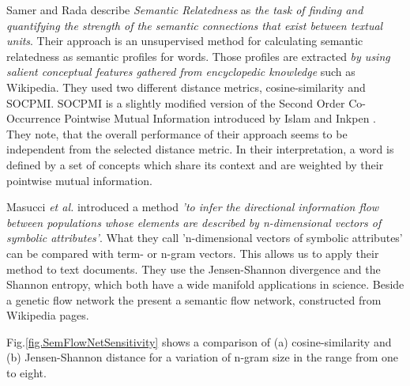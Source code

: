 \documentclass[a4paper,10pt]{scrbook}
\begin{document}
Samer and Rada \cite{Samer2011} describe \textit{Semantic Relatedness} as \textit{the task of finding and quantifying the strength of the semantic connections that exist between textual units}. Their approach is an unsupervised method for calculating semantic relatedness as semantic profiles for words. Those profiles are
extracted \textit{by using salient conceptual features gathered from
encyclopedic knowledge} such as Wikipedia. They used two different distance metrics, cosine-similarity and SOCPMI. SOCPMI is a slightly modified version of the Second Order Co-Occurrence Pointwise Mutual Information introduced by Islam and Inkpen \cite{Islam2006}. They note, that the overall performance of their approach seems to be independent from the selected distance metric. In their interpretation, a word is defined by a set of concepts which share its context and are weighted by their pointwise mutual information. 
 


Masucci \textit{et al.} \cite{Masucci2011} introduced a method \textit{'to infer the directional information flow between populations whose elements are described by n-dimensional vectors of symbolic attributes'}. What they call 'n-dimensional vectors of symbolic attributes' can be compared with term- or n-gram vectors. This allows us to apply their method to text documents. They use the Jensen-Shannon divergence and the Shannon entropy, which both have a wide manifold applications in science. Beside a genetic flow network the present a semantic flow network, constructed from Wikipedia pages. 

Fig.\ref{fig.SemFlowNetSensitivity} shows a comparison of (a) cosine-similarity and (b) Jensen-Shannon distance for a variation of n-gram size in the range from one to eight. 
 
\label{ext.fig.SemFlowNetSensitivity} 

\end{document}
